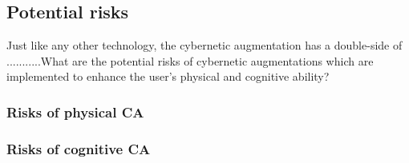 \subsection{Potential risks}
Just like any other technology, the cybernetic augmentation has a double-side of ...........What are the potential risks of cybernetic augmentations which are implemented to enhance the user's physical and cognitive ability? 

\subsubsection{Risks of physical CA}


\subsubsection{Risks of cognitive CA}
